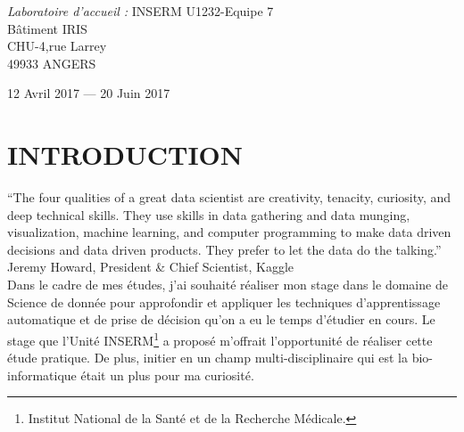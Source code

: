 \documentclass[a4paper,10pt]{article}
\newcommand\tabA[1][0.5cm]{\hspace*{#1}}
\newcommand\tabC[1][2cm]{\hspace*{#1}}
\begin{document}
\begin{titlepage}
\begin{sffamily}
\begin{center}
\begin{minipage}{9\textwidth}
\begin{doublespace}
\begin{tabular}{cl}
    \end{tabular}
     \end{doublespace}
    \emph{Laboratoire d'accueil :} \tabC \tabA \textsc{INSERM U1232}-Equipe 7
    \\\tabC \tabC \tabC \tabA Bâtiment IRIS 
    \\\tabC \tabC \tabC \tabA CHU-4,rue Larrey 
    \\\tabC \tabC \tabC \tabA 49933 ANGERS
    \end{minipage}
    \vspace*{\fill}
%  

    {\large 12 Avril 2017 — 20 Juin 2017}

  \end{center}
  \end{sffamily}
\end{titlepage}
\newpage
\tableofcontents
\newpage
\listoffigures
\newpage
\listoftables
\newpage
{}
\section{INTRODUCTION }
``The four qualities of a great data scientist are creativity, tenacity, curiosity, and deep technical skills. They use skills in data gathering and data munging, visualization, machine learning, and computer programming to make data driven decisions and data driven products. They prefer to let the data do the talking.'' 
Jeremy Howard, President \& Chief Scientist, Kaggle
\\Dans le cadre de mes études, j’ai souhaité réaliser mon stage dans le domaine de Science de donnée pour approfondir et appliquer les techniques d’apprentissage automatique et de prise de décision qu’on a eu le temps d’étudier en cours. Le stage que l’Unité INSERM\footnote{Institut National de la Santé et de la Recherche Médicale.} a proposé m’offrait l’opportunité de réaliser cette étude pratique. De plus, initier en un champ multi-disciplinaire qui est la bio-informatique était un plus pour ma curiosité.
\end{document}
